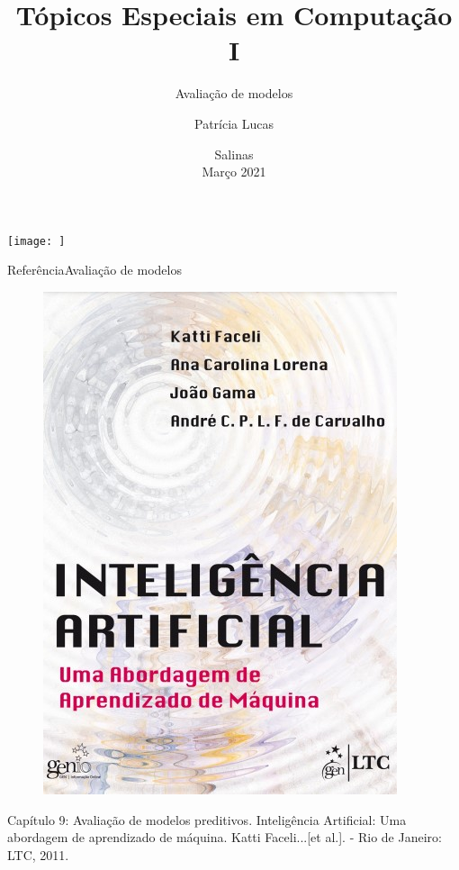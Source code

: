 \documentclass[t]{beamer}
\title[]{Tópicos Especiais em Computação I}
\subtitle[]{Avaliação de modelos}
\author[]{Patrícia Lucas\\{\footnotesize }}
\institute{Bacharelado em Sistemas de Informação \\ IFNMG  - Campus Salinas}
\date{\scriptsize Salinas\\Março 2021}
\begin{document}
\begin{frame}

\begin{center}
\texttt{[image: ]}
\end{center}
  \titlepage
\end{frame}


\begin{ftst}{Referência}{{Avaliação de modelos}}
\begin{figure}
    \includegraphics[scale=0.35]{Figuras/slide01_11.jpg}
\end{figure}
Capítulo 9: Avaliação de modelos preditivos.
\vone
\scriptsize
Inteligência Artificial: Uma abordagem de aprendizado de máquina. Katti Faceli...[et al.]. - Rio de Janeiro: LTC, 2011.

\end{ftst}
\end{document}
